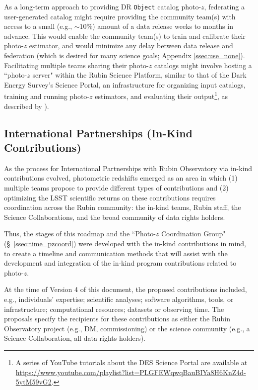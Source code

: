 \documentclass[DM,authoryear,toc]{lsstdoc}
\begin{document}
As a long-term approach to providing DR {\tt Object} catalog photo-$z$, federating a user-generated catalog might require providing the community team(s) with access to a small (e.g., $\sim10\%$) amount of a data release weeks to months in advance.
This would enable the community team(s) to train and calibrate their photo-$z$ estimator, and would minimize any delay between data release and federation (which is desired for many science goals; Appendix \ref{ssec:use_none}).
Facilitating multiple teams sharing their photo-$z$ catalogs might involve hosting a ``photo-$z$ server" within the Rubin Science Platform, similar to that of the Dark Energy Survey's Science Portal, an infrastructure for organizing input catalogs, training and running photo-$z$ estimators, and evaluating their output\footnote{A series of YouTube tutorials about the DES Science Portal are available at \url{https://www.youtube.com/playlist?list=PLGFEWqwqBauBIYa8H6KnZ4d-5ytM59vG2}.}, as described by \citet{2018A&C....25...58G}).

\subsection{International Partnerships (In-Kind Contributions)}\label{ssec:time_inkind}

As the process for International Partnerships with Rubin Observatory via in-kind contributions evolved, photometric redshifts emerged as an area in which (1) multiple teams propose to provide different types of contributions and (2) optimizing the LSST scientific returns on these contributions requires coordination across the Rubin community: the in-kind teams, Rubin staff, the Science Collaborations, and the broad community of data rights holders.

Thus, the stages of this roadmap and the ``Photo-$z$ Coordination Group" (\S~\ref{ssec:time_pzcoord}) were developed with the in-kind contributions in mind, to create a timeline and communication methods that will assist with the development and integration of the in-kind program contributions related to photo-$z$.

At the time of Version 4 of this document, the proposed contributions included, e.g., individuals' expertise; scientific analyses; software algorithms, tools, or infrastructure; computational resources; datasets or observing time.
The proposals specify the recipients for these contributions as either the Rubin Observatory project (e.g., DM, commissioning) or the science community (e.g., a Science Collaboration, all data rights holders).
\end{document}

